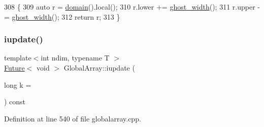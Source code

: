 \begin{DoxyCode}
308                                                                    \{
309             \textcolor{keyword}{auto} r = \hyperlink{classshark_1_1ndim_1_1_global_array_a435ee8ff23c3feadf2ef2be64d4f375c}{domain}().local();
310                         r.lower += \hyperlink{classshark_1_1ndim_1_1_global_array_a5331f21887f3c14791b758e99656a676}{ghost\_width}();
311                         r.upper -= \hyperlink{classshark_1_1ndim_1_1_global_array_a5331f21887f3c14791b758e99656a676}{ghost\_width}();
312                         \textcolor{keywordflow}{return} r;
313         \}
\end{DoxyCode}
\hypertarget{classshark_1_1ndim_1_1_global_array_a6485a70dbb541c3bc600fb96903169ef}{}\label{classshark_1_1ndim_1_1_global_array_a6485a70dbb541c3bc600fb96903169ef} 
\subsubsection{\texorpdfstring{iupdate()}{iupdate()}}
{\footnotesize\ttfamily template$<$int ndim, typename T $>$ \\
\hyperlink{structshark_1_1_future}{Future}$<$ void $>$ Global\+Array\+::iupdate (\begin{DoxyParamCaption}\item[{long}]{k = {} }\end{DoxyParamCaption}) const}



Definition at line 540 of file globalarray.\+cpp.


